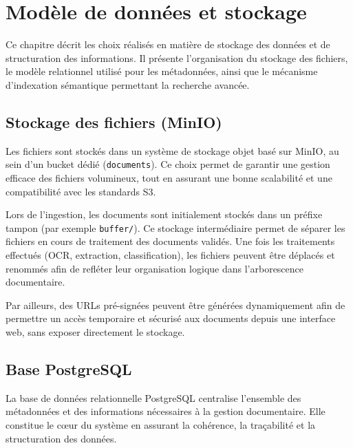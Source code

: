 \documentclass[12pt,a4paper]{report}
\begin{document}
\chapter{Modèle de données et stockage}
Ce chapitre décrit les choix réalisés en matière de stockage des données et de structuration des informations. Il présente l’organisation du stockage des fichiers, le modèle relationnel utilisé pour les métadonnées, ainsi que le mécanisme d’indexation sémantique permettant la recherche avancée.

\section{Stockage des fichiers (MinIO)}
Les fichiers sont stockés dans un système de stockage objet basé sur MinIO, au sein d’un bucket dédié (\texttt{documents}). Ce choix permet de garantir une gestion efficace des fichiers volumineux, tout en assurant une bonne scalabilité et une compatibilité avec les standards S3.

Lors de l’ingestion, les documents sont initialement stockés dans un préfixe tampon (par exemple \texttt{buffer/}). Ce stockage intermédiaire permet de séparer les fichiers en cours de traitement des documents validés. Une fois les traitements effectués (OCR, extraction, classification), les fichiers peuvent être déplacés et renommés afin de refléter leur organisation logique dans l’arborescence documentaire.

Par ailleurs, des URLs pré-signées peuvent être générées dynamiquement afin de permettre un accès temporaire et sécurisé aux documents depuis une interface web, sans exposer directement le stockage.

\section{Base PostgreSQL}
La base de données relationnelle PostgreSQL centralise l’ensemble des métadonnées et des informations nécessaires à la gestion documentaire. Elle constitue le cœur du système en assurant la cohérence, la traçabilité et la structuration des données.
\end{document}
